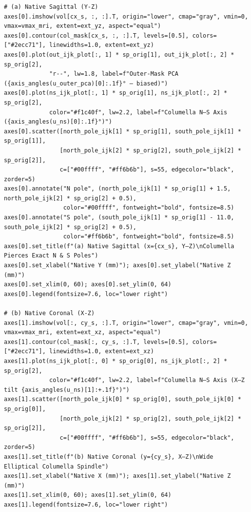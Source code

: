 \documentclass[10pt,a4paper]{article}
\renewcommand{\_}{\origunderscore\allowbreak}
\begin{document}
\begin{codebox}
\begin{lstlisting}[style=pybmed]
# (a) Native Sagittal (Y-Z)
axes[0].imshow(vol[cx_s, :, :].T, origin="lower", cmap="gray", vmin=0, vmax=vmax_mri, extent=ext_yz, aspect="equal")
axes[0].contour(col_mask[cx_s, :, :].T, levels=[0.5], colors=["#2ecc71"], linewidths=1.0, extent=ext_yz)
axes[0].plot(out_ijk_plot[:, 1] * sp_orig[1], out_ijk_plot[:, 2] * sp_orig[2],
             "r--", lw=1.8, label=f"Outer-Mask PCA ({axis_angles(u_outer_pca)[0]:.1f}° — biased)")
axes[0].plot(ns_ijk_plot[:, 1] * sp_orig[1], ns_ijk_plot[:, 2] * sp_orig[2],
             color="#f1c40f", lw=2.2, label=f"Columella N–S Axis ({axis_angles(u_ns)[0]:.1f}°)")
axes[0].scatter([north_pole_ijk[1] * sp_orig[1], south_pole_ijk[1] * sp_orig[1]],
                [north_pole_ijk[2] * sp_orig[2], south_pole_ijk[2] * sp_orig[2]],
                c=["#00ffff", "#ff6b6b"], s=55, edgecolor="black", zorder=5)
axes[0].annotate("N pole", (north_pole_ijk[1] * sp_orig[1] + 1.5, north_pole_ijk[2] * sp_orig[2] + 0.5),
                 color="#00ffff", fontweight="bold", fontsize=8.5)
axes[0].annotate("S pole", (south_pole_ijk[1] * sp_orig[1] - 11.0, south_pole_ijk[2] * sp_orig[2] + 0.5),
                 color="#ff6b6b", fontweight="bold", fontsize=8.5)
axes[0].set_title(f"(a) Native Sagittal (x={cx_s}, Y–Z)\nColumella Pierces Exact N & S Poles")
axes[0].set_xlabel("Native Y (mm)"); axes[0].set_ylabel("Native Z (mm)")
axes[0].set_xlim(0, 60); axes[0].set_ylim(0, 64)
axes[0].legend(fontsize=7.6, loc="lower right")

# (b) Native Coronal (X-Z)
axes[1].imshow(vol[:, cy_s, :].T, origin="lower", cmap="gray", vmin=0, vmax=vmax_mri, extent=ext_xz, aspect="equal")
axes[1].contour(col_mask[:, cy_s, :].T, levels=[0.5], colors=["#2ecc71"], linewidths=1.0, extent=ext_xz)
axes[1].plot(ns_ijk_plot[:, 0] * sp_orig[0], ns_ijk_plot[:, 2] * sp_orig[2],
             color="#f1c40f", lw=2.2, label=f"Columella N–S Axis (X–Z tilt {axis_angles(u_ns)[1]:+.1f}°)")
axes[1].scatter([north_pole_ijk[0] * sp_orig[0], south_pole_ijk[0] * sp_orig[0]],
                [north_pole_ijk[2] * sp_orig[2], south_pole_ijk[2] * sp_orig[2]],
                c=["#00ffff", "#ff6b6b"], s=55, edgecolor="black", zorder=5)
axes[1].set_title(f"(b) Native Coronal (y={cy_s}, X–Z)\nWide Elliptical Columella Spindle")
axes[1].set_xlabel("Native X (mm)"); axes[1].set_ylabel("Native Z (mm)")
axes[1].set_xlim(0, 60); axes[1].set_ylim(0, 64)
axes[1].legend(fontsize=7.6, loc="lower right")


\end{lstlisting}
\end{codebox}
\end{document}
